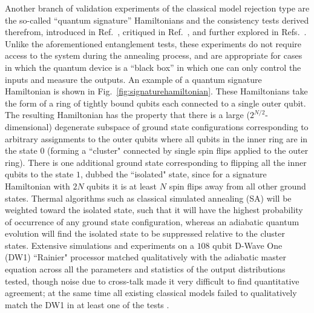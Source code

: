 Another branch of validation experiments of the classical model rejection type are the so-called ``quantum signature'' Hamiltonians and the consistency tests derived therefrom, introduced in Ref.~\cite{q-sig}, critiqued in Ref.~\cite{Smolin}, and further explored in Refs.~\cite{comment-SS,q-sig2,SSSV-comment}. Unlike the aforementioned entanglement tests, these experiments do not require access to the system during the annealing process, and are appropriate for cases in which the quantum device is a ``black box'' in which one can only control the inputs and measure the outputs. An example of a quantum signature Hamiltonian is shown in Fig.~\ref{fig:signaturehamiltonian}. These Hamiltonians take the form of a ring of tightly bound qubits each connected to a single outer qubit. The resulting Hamiltonian has the property that there is a large ($2^{N/2}$-dimensional) degenerate subspace of ground state configurations corresponding to arbitrary assignments to the outer qubits where all qubits in the inner ring are in the state $0$ (forming a ``cluster" connected by single spin flips applied to the outer ring). There is one additional ground state corresponding to flipping all the inner qubits to the state $1$, dubbed the ``isolated" state, since for a signature Hamiltonian with $2N$ qubits it is at least $N$ spin flips away from all other ground states. Thermal algorithms such as classical simulated annealing (SA) \cite{kirkpatrick_optimization_1983} will be weighted toward the isolated state, such that it will have the highest probability of occurrence of any ground state configuration, whereas an adiabatic quantum evolution will find the isolated state to be suppressed relative to the cluster states. Extensive simulations and experiments on a $108$ qubit D-Wave One (DW1) ``Rainier" processor matched qualitatively with the adiabatic master equation across all the parameters and statistics of the output distributions tested, though noise due to cross-talk made it very difficult to find quantitative agreement; at the same time all existing classical models failed to qualitatively match the DW1 in at least one of the tests \cite{q-sig2}.

